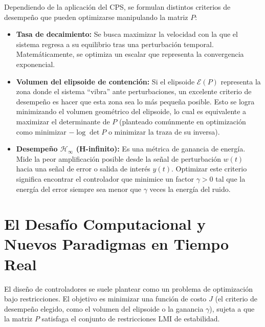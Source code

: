 Dependiendo de la aplicación del CPS, se formulan distintos criterios de desempeño que pueden optimizarse manipulando la matriz $P$:

\begin{itemize}
    \item \textbf{Tasa de decaimiento:} Se busca maximizar la velocidad con la que el sistema regresa a su equilibrio tras una perturbación temporal. Matemáticamente, se optimiza un escalar que representa la convergencia exponencial.
    \item \textbf{Volumen del elipsoide de contención:} Si el elipsoide $\mathcal{E}(P)$ representa la zona donde el sistema ``vibra'' ante perturbaciones, un excelente criterio de desempeño es hacer que esta zona sea lo más pequeña posible. Esto se logra minimizando el volumen geométrico del elipsoide, lo cual es equivalente a maximizar el determinante de $P$ (planteado comúnmente en optimización como minimizar $-\log \det P$ o minimizar la traza de su inversa).
    \item \textbf{Desempeño $\mathcal{H}_\infty$ (H-infinito):} Es una métrica de ganancia de energía. Mide la peor amplificación posible desde la señal de perturbación $w(t)$ hacia una señal de error o salida de interés $y(t)$. Optimizar este criterio significa encontrar el controlador que minimice un factor $\gamma > 0$ tal que la energía del error siempre sea menor que $\gamma$ veces la energía del ruido.
\end{itemize}























\section{El Desafío Computacional y Nuevos Paradigmas en Tiempo Real}

El diseño de controladores se suele plantear como un problema de optimización bajo restricciones. El objetivo es minimizar una función de costo $J$ (el criterio de desempeño elegido, como el volumen del elipsoide o la ganancia $\gamma$), sujeta a que la matriz $P$ satisfaga el conjunto de restricciones LMI de estabilidad.

